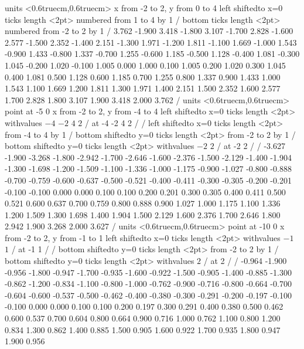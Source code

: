 \figure
\texonly
\vbox{\beginpicture
\normalgraphs
\eightpoint
\setcoordinatesystem units <0.6truecm,0.6truecm>
\setplotarea x from -2 to 2, y from 0 to 4
\axis left shiftedto x=0 ticks length <2pt> numbered from 1 to 4 by 1 /
\axis bottom ticks length <2pt> numbered from -2 to 2 by 1 /
 3.762 -1.900 3.418 -1.800 3.107 -1.700 2.828 -1.600 2.577 
-1.500 2.352 -1.400 2.151 -1.300 1.971 -1.200 1.811 -1.100 1.669 
-1.000 1.543 -0.900 1.433 -0.800 1.337 -0.700 1.255 -0.600 1.185 
-0.500 1.128 -0.400 1.081 -0.300 1.045 -0.200 1.020 -0.100 1.005 
0.000 1.000 0.100 1.005 0.200 1.020 0.300 1.045 0.400 1.081 
0.500 1.128 0.600 1.185 0.700 1.255 0.800 1.337 0.900 1.433 
1.000 1.543 1.100 1.669 1.200 1.811 1.300 1.971 1.400 2.151 
1.500 2.352 1.600 2.577 1.700 2.828 1.800 3.107 1.900 3.418 
2.000 3.762 /
\setcoordinatesystem units <0.6truecm,0.6truecm> point at -5 0
\setplotarea x from -2 to 2, y from -4 to 4
\axis left shiftedto x=0 ticks length <2pt> withvalues {$-4$} {$-2$}
{$4$} {$2$} / at -4  -2  4 2 / /
\axis left shiftedto x=0 ticks length <2pt> from -4 to 4 by 1 /
\axis bottom shiftedto y=0 ticks length <2pt> from -2 to 2 by 1 /
\axis bottom shiftedto y=0 ticks length <2pt> withvalues {$-2$} {$2$} / at -2 2 / /
 -3.627 -1.900 -3.268 -1.800 -2.942 -1.700 -2.646 -1.600 -2.376 
-1.500 -2.129 -1.400 -1.904 -1.300 -1.698 -1.200 -1.509 -1.100 -1.336 
-1.000 -1.175 -0.900 -1.027 -0.800 -0.888 -0.700 -0.759 -0.600 -0.637 
-0.500 -0.521 -0.400 -0.411 -0.300 -0.305 -0.200 -0.201 -0.100 -0.100 
0.000 0.000 0.100 0.100 0.200 0.201 0.300 0.305 0.400 0.411 
0.500 0.521 0.600 0.637 0.700 0.759 0.800 0.888 0.900 1.027 
1.000 1.175 1.100 1.336 1.200 1.509 1.300 1.698 1.400 1.904 
1.500 2.129 1.600 2.376 1.700 2.646 1.800 2.942 1.900 3.268 
2.000 3.627 /
\setcoordinatesystem units <0.6truecm,0.6truecm> point at -10 0
\setplotarea x from -2 to 2, y from -1 to 1
\axis left shiftedto x=0 ticks length <2pt> withvalues {$-1$} {$1$} / at -1 1 / /
\axis bottom shiftedto y=0 ticks length <2pt> from -2 to 2 by 1 /
\axis bottom shiftedto y=0 ticks length <2pt> withvalues {$2$} / at 2 / /
 -0.964 -1.900 -0.956 -1.800 -0.947 -1.700 -0.935 -1.600 -0.922 
-1.500 -0.905 -1.400 -0.885 -1.300 -0.862 -1.200 -0.834 -1.100 -0.800 
-1.000 -0.762 -0.900 -0.716 -0.800 -0.664 -0.700 -0.604 -0.600 -0.537 
-0.500 -0.462 -0.400 -0.380 -0.300 -0.291 -0.200 -0.197 -0.100 -0.100 
0.000 0.000 0.100 0.100 0.200 0.197 0.300 0.291 0.400 0.380 
0.500 0.462 0.600 0.537 0.700 0.604 0.800 0.664 0.900 0.716 
1.000 0.762 1.100 0.800 1.200 0.834 1.300 0.862 1.400 0.885 
1.500 0.905 1.600 0.922 1.700 0.935 1.800 0.947 1.900 0.956 
}
